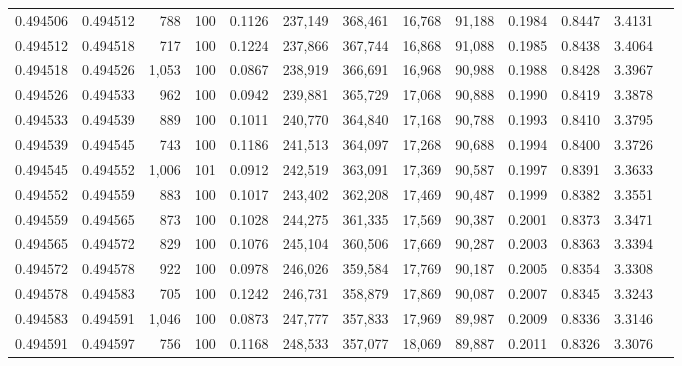 \begin{tabular}{rrrrrrrrrrrrr}
0.494506 & 0.494512 &   788 & 100 &                                     0.1126 & 237,149 & 368,461 &  16,768 &  91,188 & 0.1984 & 0.8447 & 3.4131 \\
0.494512 & 0.494518 &   717 & 100 &                                     0.1224 & 237,866 & 367,744 &  16,868 &  91,088 & 0.1985 & 0.8438 & 3.4064 \\
0.494518 & 0.494526 & 1,053 & 100 &                                     0.0867 & 238,919 & 366,691 &  16,968 &  90,988 & 0.1988 & 0.8428 & 3.3967 \\
0.494526 & 0.494533 &   962 & 100 &                                     0.0942 & 239,881 & 365,729 &  17,068 &  90,888 & 0.1990 & 0.8419 & 3.3878 \\
0.494533 & 0.494539 &   889 & 100 &                                     0.1011 & 240,770 & 364,840 &  17,168 &  90,788 & 0.1993 & 0.8410 & 3.3795 \\
0.494539 & 0.494545 &   743 & 100 &                                     0.1186 & 241,513 & 364,097 &  17,268 &  90,688 & 0.1994 & 0.8400 & 3.3726 \\
0.494545 & 0.494552 & 1,006 & 101 &                                     0.0912 & 242,519 & 363,091 &  17,369 &  90,587 & 0.1997 & 0.8391 & 3.3633 \\
0.494552 & 0.494559 &   883 & 100 &                                     0.1017 & 243,402 & 362,208 &  17,469 &  90,487 & 0.1999 & 0.8382 & 3.3551 \\
0.494559 & 0.494565 &   873 & 100 &                                     0.1028 & 244,275 & 361,335 &  17,569 &  90,387 & 0.2001 & 0.8373 & 3.3471 \\
0.494565 & 0.494572 &   829 & 100 &                                     0.1076 & 245,104 & 360,506 &  17,669 &  90,287 & 0.2003 & 0.8363 & 3.3394 \\
0.494572 & 0.494578 &   922 & 100 &                                     0.0978 & 246,026 & 359,584 &  17,769 &  90,187 & 0.2005 & 0.8354 & 3.3308 \\
0.494578 & 0.494583 &   705 & 100 &                                     0.1242 & 246,731 & 358,879 &  17,869 &  90,087 & 0.2007 & 0.8345 & 3.3243 \\
0.494583 & 0.494591 & 1,046 & 100 &                                     0.0873 & 247,777 & 357,833 &  17,969 &  89,987 & 0.2009 & 0.8336 & 3.3146 \\
0.494591 & 0.494597 &   756 & 100 &                                     0.1168 & 248,533 & 357,077 &  18,069 &  89,887 & 0.2011 & 0.8326 & 3.3076 \\

\end{tabular}
